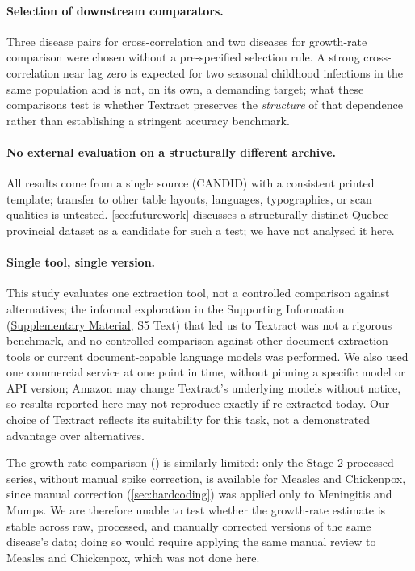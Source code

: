 \documentclass[12pt]{article}
\begin{document}
\paragraph{Selection of downstream comparators.} Three disease pairs for cross-correlation and two diseases for growth-rate comparison were chosen without a pre-specified selection rule. A strong cross-correlation near lag zero is expected for two seasonal childhood infections in the same population and is not, on its own, a demanding target; what these comparisons test is whether Textract preserves the \emph{structure} of that dependence rather than establishing a stringent accuracy benchmark.

\paragraph{No external evaluation on a structurally different archive.} All results come from a single source (CANDID) with a consistent printed template; transfer to other table layouts, languages, typographies, or scan qualities is untested. \cref{sec:futurework} discusses a structurally distinct Quebec provincial dataset as a candidate for such a test; we have not analysed it here.

\paragraph{Single tool, single version.} This study evaluates one extraction tool, not a controlled comparison against alternatives; the informal exploration in the Supporting Information (\hyperref[sec:supp]{Supplementary Material}, S5 Text) that led us to Textract was not a rigorous benchmark, and no controlled comparison against other document-extraction tools or current document-capable language models was performed. We also used one commercial service at one point in time, without pinning a specific model or API version; Amazon may change Textract's underlying models without notice, so results reported here may not reproduce exactly if re-extracted today. Our choice of Textract reflects its suitability for this task, not a demonstrated advantage over alternatives.

The growth-rate comparison () is similarly limited: only the Stage-2 processed series, without manual spike correction, is available for Measles and Chickenpox, since manual correction (\cref{sec:hardcoding}) was applied only to Meningitis and Mumps. We are therefore unable to test whether the growth-rate estimate is stable across raw, processed, and manually corrected versions of the same disease's data; doing so would require applying the same manual review to Measles and Chickenpox, which was not done here.
\end{document}
